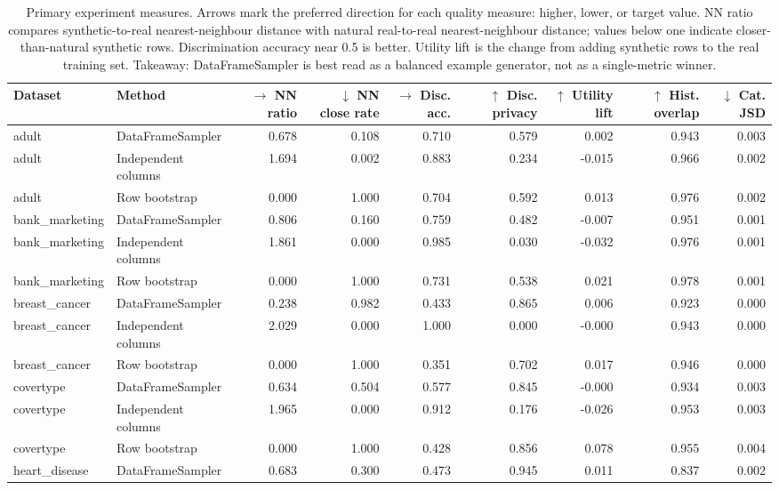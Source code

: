 \begin{table}
\caption{Primary experiment measures. Arrows mark the preferred direction for each quality measure: higher, lower, or target value. NN ratio compares synthetic-to-real nearest-neighbour distance with natural real-to-real nearest-neighbour distance; values below one indicate closer-than-natural synthetic rows. Discrimination accuracy near 0.5 is better. Utility lift is the change from adding synthetic rows to the real training set. Takeaway: DataFrameSampler is best read as a balanced example generator, not as a single-metric winner.}
\label{tab:main-measures}
\begin{adjustbox}{max width=\textwidth}
\begin{tabular}{llrrrrrrr}
\toprule
Dataset & Method & $\rightarrow$ NN ratio & $\downarrow$ NN close rate & $\rightarrow$ Disc. acc. & $\uparrow$ Disc. privacy & $\uparrow$ Utility lift & $\uparrow$ Hist. overlap & $\downarrow$ Cat. JSD \\
\midrule
adult & DataFrameSampler & 0.678 & 0.108 & 0.710 & 0.579 & 0.002 & 0.943 & 0.003 \\
adult & Independent columns & 1.694 & 0.002 & 0.883 & 0.234 & -0.015 & 0.966 & 0.002 \\
adult & Row bootstrap & 0.000 & 1.000 & 0.704 & 0.592 & 0.013 & 0.976 & 0.002 \\
bank\_marketing & DataFrameSampler & 0.806 & 0.160 & 0.759 & 0.482 & -0.007 & 0.951 & 0.001 \\
bank\_marketing & Independent columns & 1.861 & 0.000 & 0.985 & 0.030 & -0.032 & 0.976 & 0.001 \\
bank\_marketing & Row bootstrap & 0.000 & 1.000 & 0.731 & 0.538 & 0.021 & 0.978 & 0.001 \\
breast\_cancer & DataFrameSampler & 0.238 & 0.982 & 0.433 & 0.865 & 0.006 & 0.923 & 0.000 \\
breast\_cancer & Independent columns & 2.029 & 0.000 & 1.000 & 0.000 & -0.000 & 0.943 & 0.000 \\
breast\_cancer & Row bootstrap & 0.000 & 1.000 & 0.351 & 0.702 & 0.017 & 0.946 & 0.000 \\
covertype & DataFrameSampler & 0.634 & 0.504 & 0.577 & 0.845 & -0.000 & 0.934 & 0.003 \\
covertype & Independent columns & 1.965 & 0.000 & 0.912 & 0.176 & -0.026 & 0.953 & 0.003 \\
covertype & Row bootstrap & 0.000 & 1.000 & 0.428 & 0.856 & 0.078 & 0.955 & 0.004 \\
heart\_disease & DataFrameSampler & 0.683 & 0.300 & 0.473 & 0.945 & 0.011 & 0.837 & 0.002 \\

\end{tabular}
\end{adjustbox}
\end{table}
